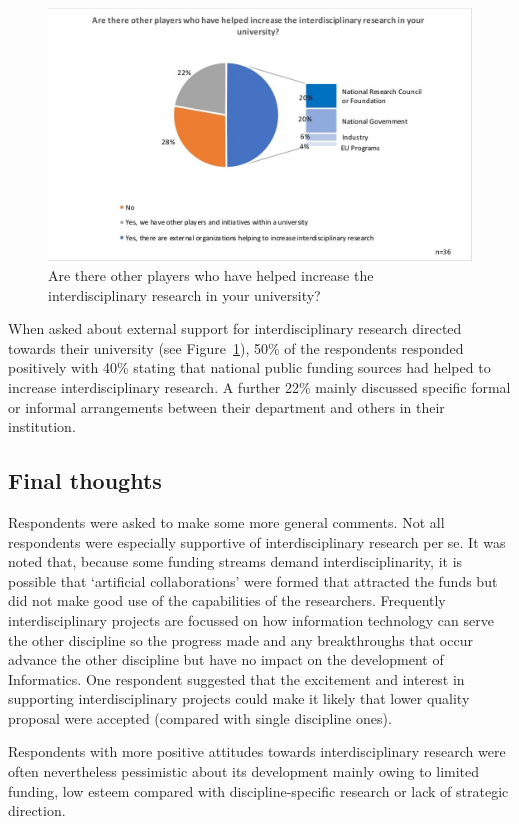 \begin{figure}[h]
\centering
\includegraphics[width = \linewidth]{charts/1d.jpg}
\caption
{Are there other players who have helped increase the
interdisciplinary research in your university?}
\label{sect1:additional}
\end{figure}

When asked about external support for interdisciplinary research directed towards their university (see Figure~\ref{sect1:additional}), 50\% of the respondents responded positively with 40\% stating that national public funding sources had helped to increase interdisciplinary research. A further 22\% mainly discussed specific formal or informal arrangements between their department and others in their institution.

\subsection{Final thoughts}

Respondents were asked to make some more general comments. Not all respondents were especially supportive of interdisciplinary research per se. It was noted that, because some funding streams demand interdisciplinarity, it is possible that `artificial collaborations' were formed that attracted the funds but did not make good use of the capabilities of the researchers. Frequently interdisciplinary projects are focussed on how information technology can serve the other discipline so the progress made and any breakthroughs that occur advance the other discipline but have no impact on the development of Informatics. One respondent suggested that the excitement and interest in supporting interdisciplinary projects could make it likely that lower quality proposal were accepted (compared with single discipline ones).

Respondents with more positive attitudes towards interdisciplinary research were often nevertheless pessimistic about its development mainly owing to limited funding, low esteem compared with discipline-specific research or lack of strategic direction.

